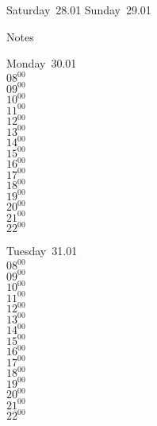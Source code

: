 \documentclass[11pt,a4paper]{book}\usepackage[]{graphicx}\usepackage[]{color}
\begin{document}
\begin{weekendbox}
  Saturday~28.01
  \tcblower
  Sunday~29.01
\end{weekendbox} %
\begin{notebox}
  Notes
\end{notebox}
\clearpage
\begin{headerbox}
\end{headerbox}
\begin{weekdaybox}
  Monday~30.01\\
  { 
  \vfill
  $08^{00}$\\
$09^{00}$\\
$10^{00}$\\
$11^{00}$\\
$12^{00}$\\
$13^{00}$\\
$14^{00}$\\
$15^{00}$\\
$16^{00}$\\
$17^{00}$\\
$18^{00}$\\
$19^{00}$\\
$20^{00}$\\
$21^{00}$\\
$22^{00}$\\
  }
\end{weekdaybox}
\begin{weekdaybox}
  Tuesday~31.01\\
  { 
  \vfill
  $08^{00}$\\
$09^{00}$\\
$10^{00}$\\
$11^{00}$\\
$12^{00}$\\
$13^{00}$\\
$14^{00}$\\
$15^{00}$\\
$16^{00}$\\
$17^{00}$\\
$18^{00}$\\
$19^{00}$\\
$20^{00}$\\
$21^{00}$\\
$22^{00}$\\
  }
\end{weekdaybox}
\end{document}
